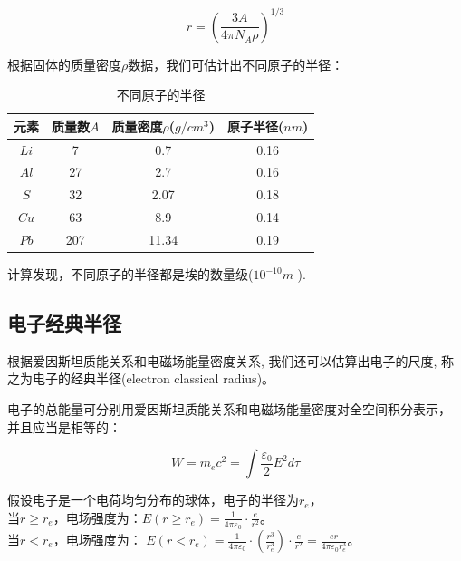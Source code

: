 \begin{equation}
r = \left( {\frac{{3A}}{{4\pi N_A \rho }}} \right)^{1/3}
\end{equation}

根据固体的质量密度$\rho $数据，我们可估计出不同原子的半径：

\begin{table}[h]
\begin{center}
\caption{不同原子的半径}
\begin{tabular}{|c|c|c|c|}

\hline  元素&   质量数$A$&    质量密度$\rho$($g / cm^3$)&
原子半径($nm$)\\
\hline $Li$&  7&  0.7&   0.16\\
\hline $Al$& 27& 2.7& 0.16\\
\hline $S$&  32& 2.07&    0.18\\
\hline $Cu$&  63& 8.9&    0.14\\
\hline $Pb$&  207& 11.34&    0.19\\
\hline
\end{tabular}
\end{center}
\end{table}

计算发现，不同原子的半径都是埃的数量级($10^{ - 10} m$ ).


\subsection{电子经典半径}

根据爱因斯坦质能关系和电磁场能量密度关系,
我们还可以估算出电子的尺度, 称之为电子的经典半径(electron classical
radius)。


电子的总能量可分别用爱因斯坦质能关系和电磁场能量密度对全空间积分表示，
并且应当是相等的：

\begin{equation}
W = m_e c^2  = \int {\frac{{\varepsilon _0
}}{2}E^2 d\tau }
\end{equation}

假设电子是一个电荷均匀分布的球体，电子的半径为$r_e$，\\
当$r \ge r_e$，电场强度为：$E(r \ge r_e ) = \frac{1}{{4\pi
\varepsilon _0 }} \cdot \frac{e}{{r^2 }}$。\\
当$r < r_e$，电场强度为： $E(r < r_e ) = \frac{1}{{4\pi \varepsilon
_0 }} \cdot \left( {\frac{{r^3 }}{{r_e ^3 }}} \right) \cdot
\frac{e}{{r^2 }} = \frac{{er}}{{4\pi \varepsilon _0 r_e ^3 }}$。

